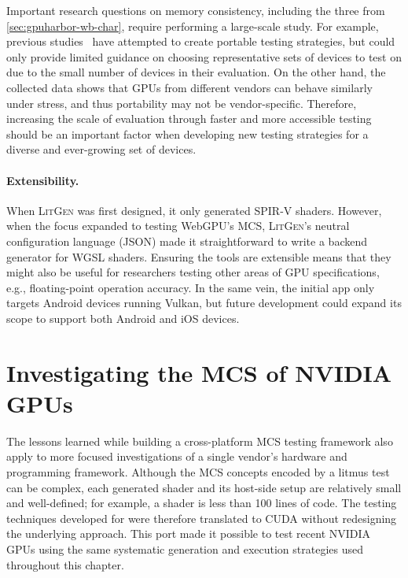 Important research questions on memory consistency, including the three from \mysec\ref{sec:gpuharbor-wb-char}, require performing a large-scale study. For example, previous studies~\cite{kirkham2020foundations} have attempted to create portable testing strategies, but could only provide limited guidance on choosing representative sets of devices to test on due to the small number of devices in their evaluation. On the other hand, the collected data shows that GPUs from different vendors can behave similarly under stress, and thus portability may not be vendor-specific. Therefore, increasing the scale of evaluation through faster and more accessible testing should be an important factor when developing new testing strategies for a diverse and ever-growing set of devices.

\paragraph{Extensibility.}

When \textsc{LitGen} was first designed, it only generated SPIR-V shaders. However, when the focus expanded to testing WebGPU's MCS, \textsc{LitGen}'s neutral configuration language (JSON) made it straightforward to write a backend generator for WGSL shaders. Ensuring the tools are extensible means that they might also be useful for researchers testing other areas of GPU specifications, e.g., floating-point operation accuracy. In the same vein, the initial app only targets Android devices running Vulkan, but future development could expand its scope to support both Android and iOS devices.

\section{Investigating the MCS of NVIDIA GPUs \label{sec:gpuharbor-nvidia-mcs}}

The lessons learned while building a cross-platform MCS testing framework also apply to more focused investigations of a single vendor's hardware and programming framework. Although the MCS concepts encoded by a litmus test can be complex, each generated shader and its host-side setup are relatively small and well-defined; for example, a shader is less than 100 lines of code. The testing techniques developed for \gpuharbor were therefore translated to CUDA without redesigning the underlying approach. This port made it possible to test recent NVIDIA GPUs using the same systematic generation and execution strategies used throughout this chapter.

